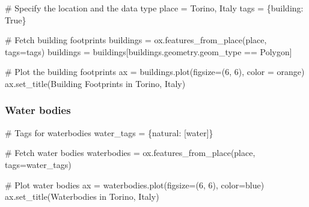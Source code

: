 \documentclass[
  letterpaper,
  DIV=11,
  numbers=noendperiod]{scrreprt}
\newenvironment{Shaded}{\begin{snugshade}}{\end{snugshade}}
\newcommand{\CommentTok}[1]{\textcolor[rgb]{0.37,0.37,0.37}{#1}}
\newcommand{\DecValTok}[1]{\textcolor[rgb]{0.68,0.00,0.00}{#1}}
\newcommand{\NormalTok}[1]{\textcolor[rgb]{0.00,0.23,0.31}{#1}}
\newcommand{\OperatorTok}[1]{\textcolor[rgb]{0.37,0.37,0.37}{#1}}
\newcommand{\StringTok}[1]{\textcolor[rgb]{0.13,0.47,0.30}{#1}}
\newcommand{\VariableTok}[1]{\textcolor[rgb]{0.07,0.07,0.07}{#1}}
\begin{document}
\begin{Shaded}
\begin{Highlighting}[]
\CommentTok{\# Specify the location and the data type}
\NormalTok{place }\OperatorTok{=} \StringTok{\textquotesingle{}Torino, Italy\textquotesingle{}}
\NormalTok{tags }\OperatorTok{=}\NormalTok{ \{}\StringTok{\textquotesingle{}building\textquotesingle{}}\NormalTok{: }\VariableTok{True}\NormalTok{\}}

\CommentTok{\# Fetch building footprints}
\NormalTok{buildings }\OperatorTok{=}\NormalTok{ ox.features\_from\_place(place, tags}\OperatorTok{=}\NormalTok{tags)}
\NormalTok{buildings }\OperatorTok{=}\NormalTok{ buildings[buildings.geometry.geom\_type }\OperatorTok{==} \StringTok{\textquotesingle{}Polygon\textquotesingle{}}\NormalTok{]}

\CommentTok{\# Plot the building footprints}
\NormalTok{ax }\OperatorTok{=}\NormalTok{ buildings.plot(figsize}\OperatorTok{=}\NormalTok{(}\DecValTok{6}\NormalTok{, }\DecValTok{6}\NormalTok{), color }\OperatorTok{=} \StringTok{\textquotesingle{}orange\textquotesingle{}}\NormalTok{)}
\NormalTok{ax.set\_title(}\StringTok{\textquotesingle{}Building Footprints in Torino, Italy\textquotesingle{}}\NormalTok{)}
\end{Highlighting}
\end{Shaded}

\subsubsection{Water bodies}\label{water-bodies}

\begin{Shaded}
\begin{Highlighting}[]
\CommentTok{\# Tags for waterbodies}
\NormalTok{water\_tags }\OperatorTok{=}\NormalTok{ \{}\StringTok{\textquotesingle{}natural\textquotesingle{}}\NormalTok{: [}\StringTok{\textquotesingle{}water\textquotesingle{}}\NormalTok{]\}}

\CommentTok{\# Fetch water bodies}
\NormalTok{waterbodies }\OperatorTok{=}\NormalTok{ ox.features\_from\_place(place, tags}\OperatorTok{=}\NormalTok{water\_tags)}

\CommentTok{\# Plot water bodies}
\NormalTok{ax }\OperatorTok{=}\NormalTok{ waterbodies.plot(figsize}\OperatorTok{=}\NormalTok{(}\DecValTok{6}\NormalTok{, }\DecValTok{6}\NormalTok{), color}\OperatorTok{=}\StringTok{\textquotesingle{}blue\textquotesingle{}}\NormalTok{)}
\NormalTok{ax.set\_title(}\StringTok{\textquotesingle{}Waterbodies in Torino, Italy\textquotesingle{}}\NormalTok{)}
\end{Highlighting}
\end{Shaded}
\end{document}
